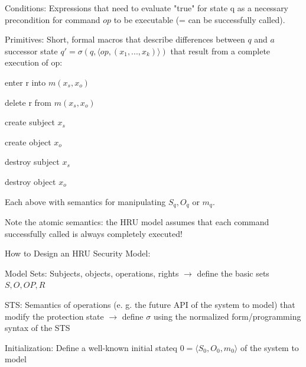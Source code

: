 \documentclass[a4paper]{article}
\begin{document}
\begin{multicols}{3}
    Conditions: Expressions that need to evaluate "true" for state q as a necessary precondition for command $op$ to be executable (= can be successfully called).

    Primitives: Short, formal macros that describe differences between $q$ and $a$ successor state $q'=\sigma(q,⟨op,(x_1 ,...,x_k)⟩)$ that result from a complete execution of op:
    \begin{itemize*}
        \item enter r into $m(x_s,x_o)$
        \item delete r from $m(x_s,x_o)$
        \item create subject $x_s$
        \item create object $x_o$
        \item destroy subject $x_s$
        \item destroy object $x_o$
        \item Each above with semantics for manipulating $S_q, O_q$ or $m_q$.
    \end{itemize*}

    Note the atomic semantics: the HRU model assumes that each command successfully called is always completely executed!

    How to Design an HRU Security Model:
    \begin{enumerate*}
        \item  Model Sets: Subjects, objects, operations, rights $\rightarrow$  define the basic sets $S,O,OP,R$
        \item STS: Semantics of operations (e. g. the future API of the system to model) that modify the protection state $\rightarrow$  define $\sigma$ using the normalized form/programming syntax of the STS
        \item Initialization: Define a well-known initial stateq $0 =⟨S_0 ,O_0 ,m_0 ⟩$ of the system to model
    \end{enumerate*}


\end{multicols}
\end{document}
